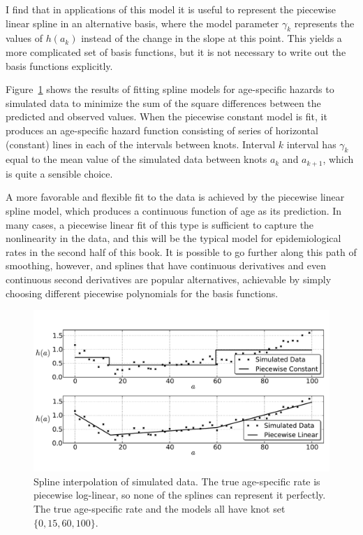 I find that in applications of this model it is useful to represent
the piecewise linear spline in an alternative basis, where the model
parameter $\gamma_k$ represents the values of $h(a_k)$ instead of the
change in the slope at this point.  This yields a more complicated set
of basis functions, but it is not necessary to write out the basis
functions explicitly.


Figure~\ref{splines_fig} shows the results of fitting spline models
for age-specific hazards to simulated data to minimize the sum of the
square differences between the predicted and observed values.  When
the piecewise constant model is fit, it produces an age-specific
hazard function consisting of series of horizontal (constant) lines
in each of the intervals between knots.  Interval $k$ interval has
$\gamma_k$ equal to the mean value of the simulated data between knots
$a_k$ and $a_{k+1}$, which is quite a sensible choice.

A more favorable and flexible fit to the data is achieved by the
piecewise linear spline model, which produces a continuous function
of age as its prediction. In many cases, a piecewise linear fit of
this type is sufficient to capture the nonlinearity in the data, and
this will be the typical model for epidemiological rates in the second
half of this book.  It is possible to go further along this path of
smoothing, however, and splines that have continuous derivatives and
even continuous second derivatives are popular alternatives, achievable
by simply choosing different piecewise polynomials for the basis
functions.


\begin{figure}[h]
\begin{center}
\includegraphics[width=\textwidth]{splines-fig.pdf}
\caption{Spline interpolation of simulated data. The true age-specific
  rate is piecewise log-linear, so none of the splines can represent
  it perfectly. The true age-specific rate and the models all have
  knot set $\{0, 15, 60, 100\}$.}
\label{splines_fig}
\end{center}
\end{figure}


